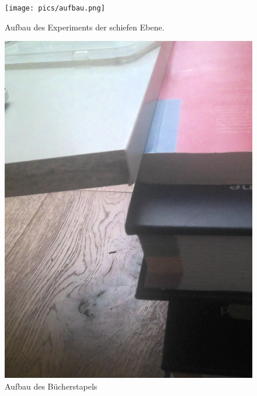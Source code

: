 \documentclass[11pt,ngerman]{scrartcl}
\begin{document}
\begin{figure}[H]
    \centering
    \begin{minipage}[htbp]{\linewidth}
        \begin{minipage}[htbp]{.65\linewidth} %
            \texttt{[image: pics/aufbau.png]}
        \caption[Aufbau des Experiments]{Aufbau des Experiments der schiefen Ebene.}
        \label{fig:aufbau}
        \end{minipage}
        \begin{minipage}[htbp]{.30\linewidth} %
            \includegraphics[width=\linewidth]{pics/buchstapel.png}
        \caption[Aufbau des Experiments Bücherstapel]{Aufbau des Bücherstapels}
        \label{fig:buchstapel}
        \end{minipage}
    \end{minipage}
 \end{figure}
\end{document}

